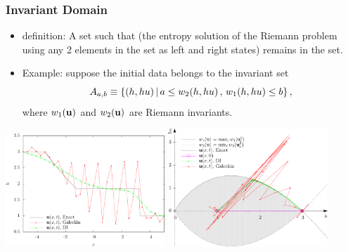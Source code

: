 \documentclass{beamer} \useoutertheme{infolines}
\begin{document}
\begin{frame}
\frametitle{Invariant Domain}

\begin{itemize}
  \item {} definition: A set such that (the entropy solution
    of the Riemann problem
    using any 2 elements in the set as left and right states) remains in the set.
  \item Example: suppose the initial data belongs to the invariant set 
    \[
      A_{a,b} \equiv \{(h,h u) \,|\,
        a \leq w_2(h, h u) \,, \, w_1(h, h u) \leq b\} \,,
    \]
    where $w_1(\mathbf{u})$ and $w_2(\mathbf{u})$ are Riemann invariants.
\end{itemize}

\begin{center}
  \includegraphics[width=0.45\textwidth]{./figures/dam_break_height.pdf}
  \hspace{1ex}
  \includegraphics[width=0.45\textwidth]{./figures/dam_break_phase_with_galerkin.pdf}
\end{center}

\end{frame}
\end{document}
